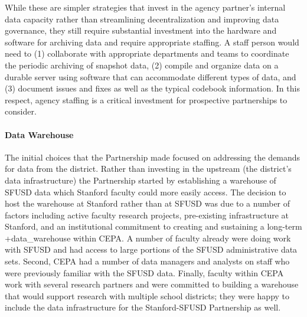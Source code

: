 \documentclass[
]{WileySix}
\begin{document}
While these are simpler strategies that invest in the agency partner's internal data capacity rather than streamlining decentralization and improving data governance, they still require substantial investment into the hardware and software for archiving data and require appropriate staffing. A staff person would need to (1) collaborate with appropriate departments and teams to coordinate the periodic archiving of snapshot data, (2) compile and organize data on a durable server using software that can accommodate different types of data, and (3) document issues and fixes as well as the typical codebook information. In this respect, agency staffing is a critical investment for prospective partnerships to consider.

\hypertarget{data-warehouse}{%
\paragraph{Data Warehouse}\label{data-warehouse}}

The initial choices that the Partnership made focused on addressing the demands for data from the district. Rather than investing in the upstream (the district's data infrastructure) the Partnership started by establishing a warehouse of SFUSD data which Stanford faculty could more easily access. The decision to host the warehouse at Stanford rather than at SFUSD was due to a number of factors including active faculty research projects, pre-existing infrastructure at Stanford, and an institutional commitment to creating and sustaining a long-term +data\_warehouse\textbar{} within CEPA. A number of faculty already were doing work with SFUSD and had access to large portions of the SFUSD administrative data sets. Second, CEPA had a number of data managers and analysts on staff who were previously familiar with the SFUSD data. Finally, faculty within CEPA work with several research partners and were committed to building a warehouse that would support research with multiple school districts; they were happy to include the data infrastructure for the Stanford-SFUSD Partnership as well.
\end{document}
